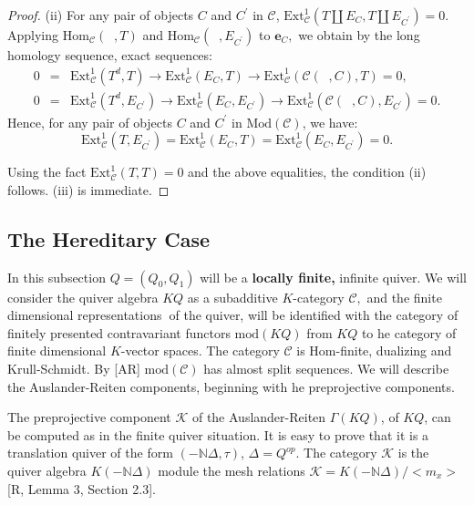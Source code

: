 \documentclass{amsart}
\theoremstyle{plain}
\numberwithin{equation}{section}
\begin{document}
\begin{proof}
(ii) For any pair of objects $C$ and $C^{\prime }$ in $\mathcal{C}$, $\mathrm{Ext}_{\mathcal{C}}^1(T\coprod E_{C},T\coprod E_{C^{\prime }})=0$.
Applying $\mathrm{Hom}_{\mathcal{C}}(\;\;,T)$ and $\mathrm{Hom}_{\mathcal{C}}(\;\;,E_{C^{\prime}})$ to $\mathbf{e}_{C},$ we obtain by the long homology
sequence, exact sequences:
\begin{eqnarray*}
0 &=&\mathrm{Ext}_{\mathcal{C}}^{1}(T^{d},T)\rightarrow \mathrm{Ext}_{\mathcal{C}}^{1}(E_{C},T)\rightarrow \mathrm{Ext}_{\mathcal{C}}^{1}(\mathcal{C}(\;\;,C),T)=0, \\
0 &=&\mathrm{Ext}_{\mathcal{C}}^{1}(T^{d},E_{C^{\prime}})\rightarrow \mathrm{Ext}_{\mathcal{C}}^{1}(E_{C},E_{C^{\prime}})\rightarrow \mathrm{Ext}_{\mathcal{C}}^{1}(\mathcal{C}(\;\;,C),E_{C^{\prime}})=0.
\end{eqnarray*}Hence, for any pair of objects $C$ and $C^{\prime }$ in $\mathrm{\mathrm{Mod}}(\mathcal{C})$, we have:
\begin{equation*}
\mathrm{Ext}_{\mathcal{C}}^{1}(T,E_{C^{\prime}})=\mathrm{Ext}_{\mathcal{C}}^{1}(E_{C},T)=\mathrm{Ext}_{\mathcal{C}}^{1}(E_{C},E_{C^{\prime}})=0\text{.}
\end{equation*}

Using the fact $\mathrm{Ext}^1_{\mathcal{C}}(T,T)=0$ and the above
equalities, the condition (ii) follows. (iii) is immediate.
\end{proof}

\subsection{The Hereditary Case}

In this subsection $Q=(Q_{0},Q_{1})$ will be a \textbf{locally finite, }infinite quiver. We will consider the quiver algebra $KQ$ as a subadditive $K $-category $\mathcal{C},$ and the finite dimensional representations\textbf{\ }of the quiver, will be identified with the category of finitely
presented contravariant functors $\mathrm{mod}(KQ)$ from $KQ$ to he category
of finite dimensional $K$-vector spaces. The category $\mathcal{C}$ is $\mathrm{Hom}$-finite, dualizing and Krull-Schmidt. By [AR] $\mathrm{mod}(\mathcal{C})$ has almost split sequences. We will describe the
Auslander-Reiten components, beginning with he preprojective components.

The preprojective component $\mathcal{K}$ of the Auslander-Reiten $\Gamma
(KQ)$, of $KQ$, can be computed as in the finite quiver situation. It is
easy to prove that it is a translation quiver of the form $(-\mathbb{N}\Delta ,\tau )$, $\Delta =Q^{op}$. The category $\mathcal{K}$ is the quiver
algebra $K(-\mathbb{N}\Delta )$ module the mesh relations $\mathcal{K=}K(-\mathbb{N}\Delta )/<m_{x}>$ [R, Lemma 3, Section 2.3].
\end{document}
